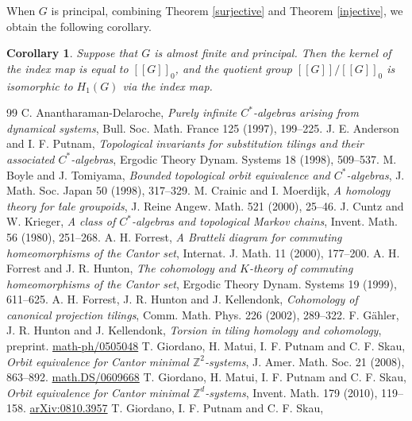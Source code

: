 \documentclass[11pt]{article}
\newtheorem{cor}[thm]{Corollary}
\theoremstyle{definition}
\newcommand{\Z}{\mathbb{Z}}
\begin{document}
When $G$ is principal, 
combining Theorem \ref{surjective} and Theorem \ref{injective}, 
we obtain the following corollary. 

\begin{cor}\label{bijective}
Suppose that $G$ is almost finite and principal. 
Then the kernel of the index map is equal to $[[G]]_0$, 
and the quotient group $[[G]]/[[G]]_0$ is isomorphic to $H_1(G)$ 
via the index map. 
\end{cor}



\begin{thebibliography}{99}
C. Anantharaman-Delaroche, 
\textit{Purely infinite $C^*$-algebras arising from dynamical systems}, 
Bull. Soc. Math. France 125 (1997), 199--225. 
J. E. Anderson and I. F. Putnam, 
\textit{Topological invariants for substitution tilings 
and their associated $C^*$-algebras}, 
Ergodic Theory Dynam. Systems 18 (1998), 509--537. 
M. Boyle and J. Tomiyama, 
\textit{Bounded topological orbit equivalence and $C^*$-algebras}, 
J. Math. Soc. Japan 50 (1998), 317--329. 
M. Crainic and I. Moerdijk, 
\textit{A homology theory for \'tale groupoids}, 
J. Reine Angew. Math. 521 (2000), 25--46. 
J. Cuntz and W. Krieger, 
\textit{A class of $C^*$-algebras and topological Markov chains}, 
Invent. Math. 56 (1980), 251--268. 
A. H. Forrest, 
\textit{A Bratteli diagram for commuting homeomorphisms of the Cantor set}, 
Internat. J. Math. 11 (2000), 177--200. 
A. H. Forrest and J. R. Hunton, 
\textit{The cohomology and $K$-theory of commuting homeomorphisms 
of the Cantor set}, 
Ergodic Theory Dynam. Systems 19 (1999), 611--625. 
A. H. Forrest, J. R. Hunton and J. Kellendonk, 
\textit{Cohomology of canonical projection tilings}, 
Comm. Math. Phys. 226 (2002), 289--322. 
F. G\"ahler, J. R. Hunton and J. Kellendonk, 
\textit{Torsion in tiling homology and cohomology}, 
preprint. 
\href{http://arxiv.org/abs/math-ph/0505048}{math-ph/0505048}
T. Giordano, H. Matui, I. F. Putnam and C. F. Skau, 
\textit{Orbit equivalence for Cantor minimal $\Z^2$-systems}, 
J. Amer. Math. Soc. 21 (2008), 863--892. 
\href{http://arxiv.org/abs/math.DS/0609668}{math.DS/0609668}
T. Giordano, H. Matui, I. F. Putnam and C. F. Skau, 
\textit{Orbit equivalence for Cantor minimal $\Z^d$-systems}, 
Invent. Math. 179 (2010), 119--158. 
\href{http://arxiv.org/abs/arXiv:0810.3957}{arXiv:0810.3957}
T. Giordano, I. F. Putnam and C. F. Skau, 

\end{thebibliography}
\end{document}
